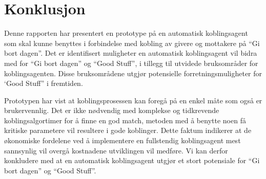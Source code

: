 \section{Konklusjon}

Denne rapporten har presentert en prototype på en automatisk koblingsagent som skal kunne benyttes i forbindelse med kobling av givere og mottakere på ``Gi bort dagen”. Det er identifisert muligheter en automatisk koblingsagent vil bidra med for ``Gi bort dagen” og ``Good Stuff”, i tillegg til utvidede bruksområder for koblingsagenten. Disse bruksområdene utgjør potensielle forretningsmuligheter for `Good Stuff” i fremtiden.

Prototypen har vist at koblingsprosessen kan foregå på en enkel måte som også er brukervennlig. Det er ikke nødvendig med komplekse og tidkrevende koblingsalgortimer for å finne en god match, metoden med å benytte noen få kritiske parametere vil resultere i gode koblinger. Dette faktum indikerer at de økonomiske fordelene ved å implementere en fullstendig koblingsagent mest sannsynlig vil overgå kostnadene utviklingen vil medføre. Vi kan derfor konkludere med at en automatisk koblingsagent utgjør et stort potensiale for ``Gi bort dagen” og ``Good Stuff”. 
